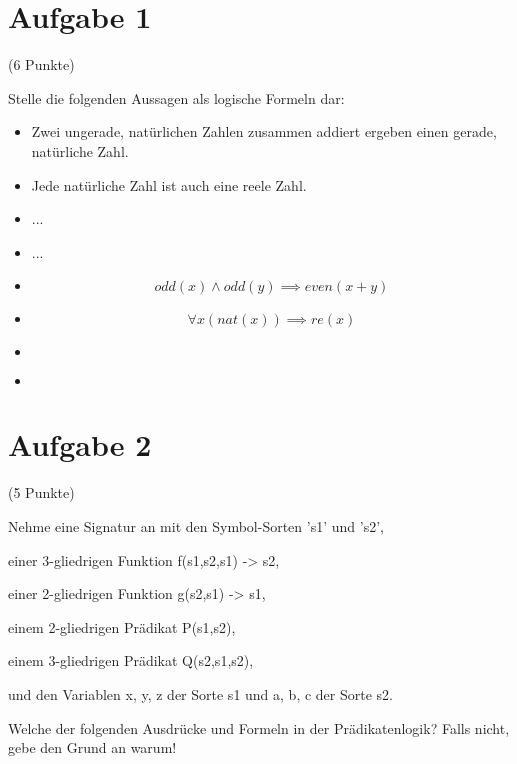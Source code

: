\documentclass{exam}
\author{Valentin Richter}
\newcommand{\Punkte}[1]{\begin{flushright}(#1 Punkte)\end{flushright}}
\begin{document}
	
	
	\section{Aufgabe 1}
	
	\Punkte{6}
	
	Stelle die folgenden Aussagen als logische Formeln dar:
	
	\begin{itemize}
		
		\item Zwei ungerade, natürlichen Zahlen zusammen addiert ergeben einen gerade, natürliche Zahl.
		\item Jede natürliche Zahl ist auch eine reele Zahl.
		\item ...
		\item ...
		
		
		\item $$ odd(x) \land odd(y) \implies even(x+y) $$
		\item $$ \forall x (nat(x)) \implies re(x) $$
		\item $$  $$
		\item $$  $$
		
	\end{itemize}
	
	
	\clearpage
	\section{Aufgabe 2}
	
	\Punkte{5}
	
	Nehme eine Signatur an mit den Symbol-Sorten 's1' und 's2',
	
	einer 3-gliedrigen Funktion f(s1,s2,s1) -> s2,
	
	einer 2-gliedrigen Funktion g(s2,s1) -> s1,
	
	einem 2-gliedrigen Prädikat P(s1,s2),
	
	einem 3-gliedrigen Prädikat Q(s2,s1,s2),
	
	und den Variablen x, y, z der Sorte s1 und a, b, c der Sorte s2.
	
	Welche der folgenden Ausdrücke und Formeln in der Prädikatenlogik? Falls nicht, gebe den Grund an warum!
	
\end{document}
